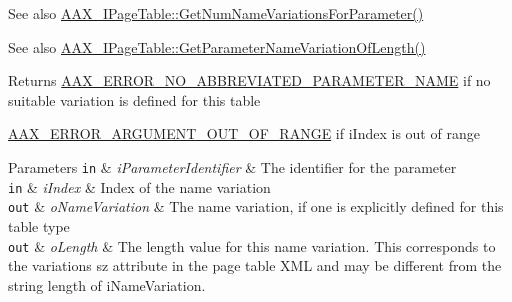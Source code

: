 \begin{DoxyItemize}
\item \begin{DoxySeeAlso}{See also}
\hyperlink{a00107_af8be797a3ec7ed3117e720dd29ea7cc7}{A\+A\+X\+\_\+\+I\+Page\+Table\+::\+Get\+Num\+Name\+Variations\+For\+Parameter()}
\end{DoxySeeAlso}

\item \begin{DoxySeeAlso}{See also}
\hyperlink{a00107_a6ddd61f6ba18b8be8141363d5234ed9d}{A\+A\+X\+\_\+\+I\+Page\+Table\+::\+Get\+Parameter\+Name\+Variation\+Of\+Length()}
\end{DoxySeeAlso}
\begin{DoxyReturn}{Returns}
\hyperlink{a00207_a5f8c7439f3a706c4f8315a9609811937ab7383b0169f6dfa5f86b1fefd6c58ae2}{A\+A\+X\+\_\+\+E\+R\+R\+O\+R\+\_\+\+N\+O\+\_\+\+A\+B\+B\+R\+E\+V\+I\+A\+T\+E\+D\+\_\+\+P\+A\+R\+A\+M\+E\+T\+E\+R\+\_\+\+N\+A\+M\+E} if no suitable variation is defined for this table

\hyperlink{a00207_a5f8c7439f3a706c4f8315a9609811937a8dd2fdd469583a046765eae9178678a3}{A\+A\+X\+\_\+\+E\+R\+R\+O\+R\+\_\+\+A\+R\+G\+U\+M\+E\+N\+T\+\_\+\+O\+U\+T\+\_\+\+O\+F\+\_\+\+R\+A\+N\+G\+E} if {\ttfamily i\+Index} is out of range
\end{DoxyReturn}

\begin{DoxyParams}[1]{Parameters}
\mbox{\tt in}  & {\em i\+Parameter\+Identifier} & The identifier for the parameter \\
\hline
\mbox{\tt in}  & {\em i\+Index} & Index of the name variation \\
\hline
\mbox{\tt out}  & {\em o\+Name\+Variation} & The name variation, if one is explicitly defined for this table type \\
\hline
\mbox{\tt out}  & {\em o\+Length} & The length value for this name variation. This corresponds to the variation\textquotesingle{}s {\ttfamily sz} attribute in the page table X\+M\+L and may be different from the string length of {\ttfamily i\+Name\+Variation}. \\
\hline
\end{DoxyParams}

\end{DoxyItemize}\hypertarget{a00075_ac4de2771c4025a98f83b89fc6104d9b0}{}
